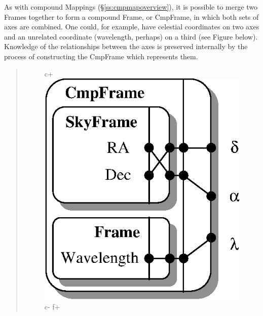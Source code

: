 \documentclass[twoside,11pt]{article}
\newcommand{\secref}[1]{\S\ref{#1}}
\newcommand{\secref}[1]{\ref{#1}}
\begin{document}
\begin{htmlonly}
   As with compound Mappings (\secref{ss:cmpmapoverview}), it is possible
   to merge two Frames together to form a compound Frame, or CmpFrame, in
   which both sets of axes are combined.  One could, for example, have
   celestial coordinates on two axes and an unrelated coordinate
   (wavelength, perhaps) on a third (see Figure below).  Knowledge of the
   relationships between the axes is preserved internally by the process
   of constructing the CmpFrame which represents them.
   \begin{quote}
   \begin{figure}
   \label{fig:cmpframe}
c+
   \includegraphics[scale=1.5]{sun211_figures/cmpframe.eps}
c-
f+

\end{figure}
\end{quote}
\end{htmlonly}
\end{document}
